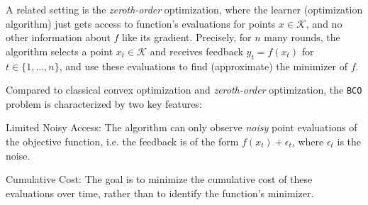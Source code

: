 \documentclass[letter, 12pt]{report}
\newcommand{\cK}{\mathcal K}
\newcommand{\1}{\mathbf{1}}
\newcommand{\bco}{\texttt{BCO}\xspace}
\theoremstyle{plain}
\theoremstyle{definition}
\theoremstyle{remark}
\begin{document}
A related setting is the \emph{zeroth-order} optimization, where the learner (optimization algorithm) just gets access to function's evaluations for points $x\in\cK$, and no other information about $f$ like its gradient.
Precisely, for $n$ many rounds, the algorithm selects a point \( x_t \in \cK \) and receives feedback \( y_t = f(x_t)\) for $t \in \{1, \ldots, n\}$, and use these evaluations to find (approximate) the minimizer of $f$.

Compared to classical convex optimization and \emph{zeroth-order} optimization, the \bco problem is characterized by two key features:
\begin{enumroman}
    \item \textcolor{dkblue}{Limited Noisy Access:} The algorithm can only observe \textit{noisy} point evaluations of the objective function, i.e. the feedback is of the form \( f(x_t) + \epsilon_t \), where \( \epsilon_t \) is the noise.
    \item \textcolor{dkblue}{Cumulative Cost:} The goal is to minimize the cumulative cost of these evaluations over time, rather than to identify the function’s minimizer.
\end{enumroman}
\end{document}
